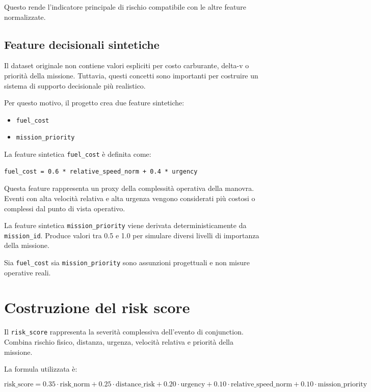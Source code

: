 \documentclass[12pt,a4paper]{article}
\begin{document}
Questo rende l'indicatore principale di rischio compatibile con le altre feature normalizzate.

\subsection{Feature decisionali sintetiche}

Il dataset originale non contiene valori espliciti per costo carburante, delta-v o priorità della missione. Tuttavia, questi concetti sono importanti per costruire un sistema di supporto decisionale più realistico.

Per questo motivo, il progetto crea due feature sintetiche:

\begin{itemize}
    \item \texttt{fuel\_cost}
    \item \texttt{mission\_priority}
\end{itemize}

La feature sintetica \texttt{fuel\_cost} è definita come:

\begin{verbatim}
fuel_cost = 0.6 * relative_speed_norm + 0.4 * urgency
\end{verbatim}

Questa feature rappresenta un proxy della complessità operativa della manovra. Eventi con alta velocità relativa e alta urgenza vengono considerati più costosi o complessi dal punto di vista operativo.

La feature sintetica \texttt{mission\_priority} viene derivata deterministicamente da \texttt{mission\_id}. Produce valori tra 0.5 e 1.0 per simulare diversi livelli di importanza della missione.

Sia \texttt{fuel\_cost} sia \texttt{mission\_priority} sono assunzioni progettuali e non misure operative reali.

\section{Costruzione del risk score}

Il \texttt{risk\_score} rappresenta la severità complessiva dell'evento di conjunction. Combina rischio fisico, distanza, urgenza, velocità relativa e priorità della missione.

La formula utilizzata è:

\[
\text{risk\_score} =
0.35 \cdot \text{risk\_norm}
+ 0.25 \cdot \text{distance\_risk}
+ 0.20 \cdot \text{urgency}
+ 0.10 \cdot \text{relative\_speed\_norm}
+ 0.10 \cdot \text{mission\_priority}
\]
\end{document}
